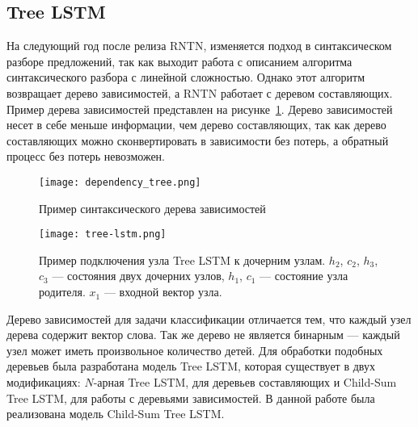 
\subsection{Tree LSTM}
На следующий год после релиза RNTN, изменяется подход в синтаксическом разборе предложений, так как выходит работа с описанием алгоритма синтаксического разбора с линейной сложностью. Однако этот алгоритм возвращает дерево зависимостей, а RNTN работает с деревом составляющих. Пример дерева зависимостей представлен на рисунке~\ref{fig:overview:dependency_tree}. Дерево зависимостей несет в себе меньше информации, чем дерево составляющих, так как дерево составляющих можно сконвертировать в зависимости без потерь, а обратный процесс без потерь невозможен\cite{Chomsky}.

\begin{figure}[h]
  \begin{center}
    \texttt{[image: dependency\_tree.png]}
    \caption{Пример синтаксического дерева зависимостей\cite{wiki:dep_grammar}}\label{fig:overview:dependency_tree}
  \end{center}
\end{figure}

\begin{figure}[h]
  \begin{center}
    \texttt{[image: tree-lstm.png]}
    \caption{Пример подключения узла Tree LSTM к дочерним узлам. $h_2$, $c_2$, $h_3$, $c_3$ --- состояния двух дочерних узлов, $h_1$, $c_1$ --- состояние узла родителя. $x_1$ --- входной вектор узла.\cite{tree_lstm}}\label{fig:overview:tree_lstm}
  \end{center}
\end{figure}

Дерево зависимостей для задачи классификации отличается тем, что каждый узел дерева содержит вектор слова. Так же дерево не является бинарным --- каждый узел может иметь произвольное количество детей. Для обработки подобных деревьев была разработана модель Tree LSTM, которая существует в двух модификациях: $N$-арная Tree LSTM, для деревьев составляющих и Child-Sum Tree LSTM, для работы с деревьями зависимостей. В данной работе была реализована модель Child-Sum Tree LSTM\cite{tree_lstm}.

